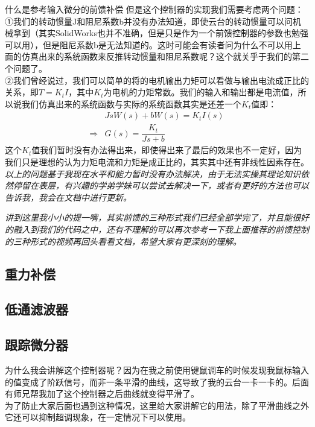 \documentclass[UTF8,a4paper,12pt]{ctexart}
\begin{document}
\begin{titlebox}{什么是参考输入微分的前馈补偿}
{            但是这个控制器的实现我们需要考虑两个问题：\\①我们的转动惯量J和阻尼系数b并没有办法知道，即使云台的转动惯量可以问机械拿到（其实SolidWorks也并不准确，但是只是作为一个前馈控制器的参数也勉强可以用），但是阻尼系数b是无法知道的。这时可能会有读者问为什么不可以用上面的仿真出来的系统函数来反推转动惯量和阻尼系数呢？这个就关乎于我们的第二个问题了。\\
            ②我们曾经说过，我们可以简单的将的电机输出力矩可以看做与输出电流成正比的关系，即$T=K_tI$，其中$K_t$为电机的力矩常数。我们的输入和输出都是电流值，所以说我们仿真出来的系统函数与实际的系统函数其实是还差一个$K_t$值即：\\
            \begin{align*}
            & JsW(s)+bW(s)= K_tI(s)\\
           \Rightarrow&G(s)=\dfrac{K_t}{Js+b}
            \end{align*} 
            这个$K_t$值我们暂时没有办法得出来，即使得出来了最后的效果也不一定好，因为我们只是理想的认为力矩电流和力矩是成正比的，其实其中还有非线性因素存在。\\

            \textit{以上的问题基于我现在水平和能力暂时没有办法解决，由于无法实操其理论知识依然停留在表层，有兴趣的学弟学妹可以尝试去解决一下，或者有更好的方法也可以告诉我，我会在文档中进行更新。}\\
          }

        \end{titlebox}
        \begin{notitlebox}
        \textit{讲到这里我小小的提一嘴，其实前馈的三种形式我们已经全部学完了，并且能很好的融入到我们的代码之中，还有不理解的可以再次参考一下我上面推荐的前馈控制的三种形式的视频再回头看看文档，希望大家有更深刻的理解。}          
        \end{notitlebox}
        \subsection{重力补偿}
      
      
        \subsection{低通滤波器}
      
      
      
        \subsection{跟踪微分器}
        \begin{flushleft}
          为什么我会讲解这个控制器呢？因为在我之前使用键鼠调车的时候发现我鼠标输入的值变成了阶跃信号，而非一条平滑的曲线，这导致了我的云台一卡一卡的。后面有师兄帮我加了这个控制器之后曲线就变得平滑了。
          \\为了防止大家后面也遇到这种情况，这里给大家讲解它的用法，除了平滑曲线之外它还可以抑制超调现象，在一定情况下可以使用。
        \end{flushleft}
\end{document}
